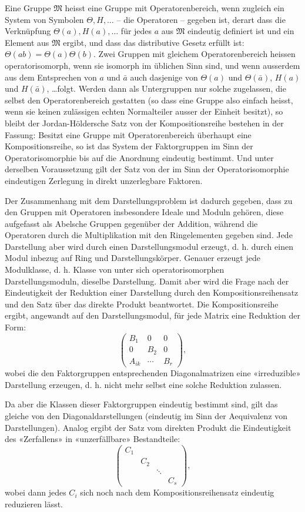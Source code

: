 \documentclass[11pt]{article}
\begin{document}
Eine Gruppe $\mathfrak{M}$ heisst eine Gruppe mit Operatorenbereich, wenn zugleich ein System von Symbolen $\Theta,H,\ldots$ -- die Operatoren -- gegeben ist, derart dass die Verknüpfung $\Theta(a),H(a),\ldots$ für jedes $a$ aus $\mathfrak{M}$ eindeutig definiert ist und ein Element aus $\mathfrak{M}$ ergibt, und dass das distributive Gesetz erfüllt ist: $\Theta(ab)=\Theta(a)\Theta(b)$. Zwei Gruppen mit gleichem Operatorenbereich heissen operatorisomorph, wenn sie isomorph im üblichen Sinn sind, und wenn ausserdem aus dem Entsprechen von $a$ und $\bar a$ auch dasjenige von $\Theta(a)$ und $\Theta(\bar a)$, $H(a)$ und $H(\bar a)$, \ldots folgt. Werden dann als Untergruppen nur solche zugelassen, die selbst den Operatorenbereich gestatten (so dass eine Gruppe also einfach heisst, wenn sie keinen zulässigen echten Normalteiler ausser der Einheit besitzt), so bleibt der Jordan-Höldersche Satz von der Kompositionsreihe bestehen in der Fassung: Besitzt eine Gruppe mit Operatorenbereich überhaupt eine Kompositionsreihe, so ist das System der Faktorgruppen im Sinn der Operatorisomorphie bis auf die Anordnung eindeutig bestimmt. Und unter derselben Voraussetzung gilt der Satz von der im Sinn der Operatorisomorphie eindeutigen Zerlegung in direkt unzerlegbare Faktoren.

Der Zusammenhang mit dem Darstellungsproblem ist dadurch gegeben, dass zu den Gruppen mit Operatoren insbesondere Ideale und Moduln gehören, diese aufgefasst als Abelsche Gruppen gegenüber der Addition, während die Operatoren durch die Multiplikation mit den Ringelementen gegeben sind. Jede Darstellung aber wird durch einen Darstellungsmodul erzeugt, d. h. durch einen Modul inbezug auf Ring und Darstellungskörper. Genauer erzeugt jede Modulklasse, d. h. Klasse von unter sich operatorisomorphen Darstellungsmoduln, dieselbe Darstellung. Damit aber wird die Frage nach der Eindeutigkeit der Reduktion einer Darstellung durch den Kompositionsreihensatz und den Satz über das direkte Produkt beantwortet. Die Kompositionsreihe ergibt, angewandt auf den Darstellungsmodul, für jede Matrix eine Reduktion der Form:
\[
\begin{pmatrix}
B_1&0&0\\
0&B_2&0\\
A_{ik}&\cdots&B_r
\end{pmatrix},
\]
wobei die den Faktorgruppen entsprechenden Diagonalmatrizen eine «irreduzible» Darstellung erzeugen, d. h. nicht mehr selbst eine solche Reduktion zulassen.

Da aber die Klassen dieser Faktorgruppen eindeutig bestimmt sind, gilt das gleiche von den Diagonaldarstellungen (eindeutig im Sinn der Aequivalenz von Darstellungen). Analog ergibt der Satz vom direkten Produkt die Eindeutigkeit des «Zerfallens» in «unzerfällbare» Bestandteile:
\[
\begin{pmatrix}
C_1&&&\\
&C_2&&\\
&&\ddots&\\
&&&C_s
\end{pmatrix},
\]
wobei dann jedes $C_i$ sich noch nach dem Kompositionsreihensatz eindeutig reduzieren lässt.
\end{document}
